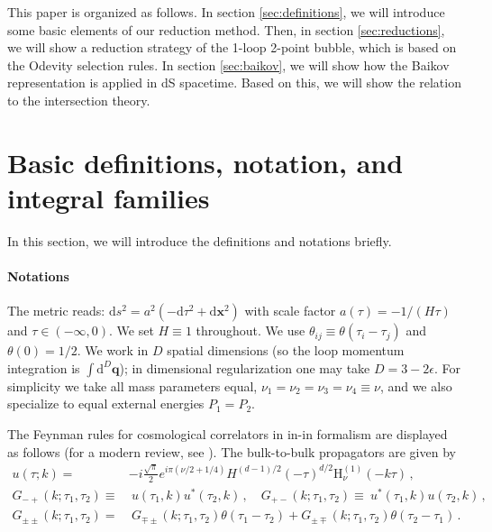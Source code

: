 \documentclass[a4paper]{article}
\newcommand{\n}{\nonumber}
\def\di{{\mathrm{d}}}
\def\mb{\mathbf}
\def\ep{\epsilon}
\newcommand{\cjq}[1]{{\color[rgb]{.1,.6,.3}{[{CJQ:} #1]}}}
\begin{document}
\cjq{添加段落总述文章结构}This paper is organized as follows. In section \ref{sec:definitions}, we will introduce some basic elements of our reduction method. Then, in section \ref{sec:reductions}, we will show a reduction strategy of the 1-loop 2-point bubble, which is based on the Odevity selection rules. In section \ref{sec:baikov}, we will show how the Baikov representation is applied in dS spacetime. Based on this, we will show the relation to the intersection theory.


\section{Basic definitions, notation, and integral families}
In this section, we will introduce the definitions and notations briefly.
\label{sec:definitions}
\paragraph{Notations} The metric reads: $\di s^2=a^2(-\di\tau^2+\di \mb x^2)$ with scale factor $a(\tau)=-1/(H\tau)$ and $\tau\in(-\infty,0)$. We set $H\equiv 1$ throughout. We use $\theta_{ij}\equiv\theta(\tau_i-\tau_j)$ and $\theta(0)=1/2$. We work in $D$ spatial dimensions (so the loop momentum integration is $\int\di^D\mb q$); in dimensional regularization one may take $D=3-2\ep$. For simplicity we take all mass parameters equal, $\nu_1=\nu_2=\nu_3=\nu_4\equiv\nu$, and we also specialize to equal external energies $P_1=P_2$.

The Feynman rules for cosmological correlators in in-in formalism are displayed as follows (for a modern review, see \cite{Chen:2017ryl}). The bulk-to-bulk propagators are given by
\begin{align}
u(\tau;k)=&-i\frac{\sqrt\pi}{2}e^{i\pi(\nu/2+1/4)}H^{(d-1)/2}(-\tau)^{d/2}\text{H}_{\nu}^{(1)}(-k\tau) \,, \n\\ 
G_{-+}(k;\tau_1,\tau_2)\equiv&~u(\tau_1,k)u^*(\tau_2,k) \, , \quad G_{+-}(k;\tau_1,\tau_2)\equiv~u^{*}(\tau_1,k)u(\tau_2,k) \,,  \n \\
G_{\pm\pm}(k;\tau_1,\tau_2)=&~G_{\mp\pm}(k;\tau_1,\tau_2)\theta(\tau_1-\tau_2)+G_{\pm\mp}(k;\tau_1,\tau_2)\theta(\tau_2-\tau_1) \,. 
\label{eq:proptype}
\end{align}
\end{document}
